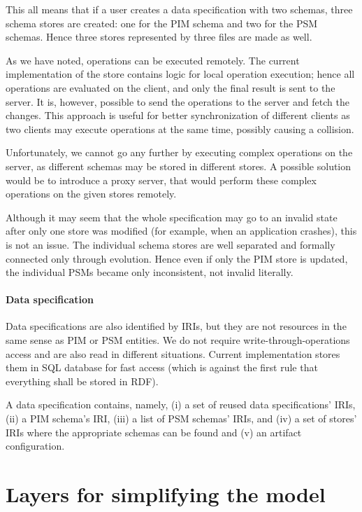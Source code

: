 This all means that if a user creates a data specification with two schemas, three schema stores are created: one for the PIM schema and two for the PSM schemas. Hence three stores represented by three files are made as well.

\medskip

As we have noted, operations can be executed remotely. The current implementation of the store contains logic for local operation execution; hence all operations are evaluated on the client, and only the final result is sent to the server. It is, however, possible to send the operations to the server and fetch the changes. This approach is useful for better synchronization of different clients as two clients may execute operations at the same time, possibly causing a collision.

Unfortunately, we cannot go any further by executing complex operations on the server, as different schemas may be stored in different stores. A possible solution would be to introduce a proxy server, that would perform these complex operations on the given stores remotely.

Although it may seem that the whole specification may go to an invalid state after only one store was modified (for example, when an application crashes), this is not an issue. The individual schema stores are well separated and formally connected only through evolution. Hence even if only the PIM store is updated, the individual PSMs became only inconsistent, not invalid literally.

\paragraph{Data specification}

Data specifications are also identified by IRIs, but they are not resources in the same sense as PIM or PSM entities. We do not require write-through-operations access and are also read in different situations. Current implementation stores them in SQL database for fast access (which is against the first rule that everything shall be stored in RDF).

A data specification contains, namely, (i) a set of reused data specifications' IRIs, (ii) a PIM schema's IRI, (iii) a list of PSM schemas' IRIs, and (iv) a set of stores' IRIs where the appropriate schemas can be found and (v) an artifact configuration.

\section{Layers for simplifying the model}


